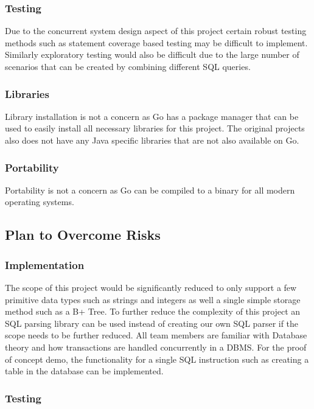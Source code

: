 \documentclass[12pt,letterpaper]{article}
\begin{document}
\subsubsection{Testing}

Due to the concurrent system design aspect of this project certain robust testing methods such as statement coverage based testing may be difficult to implement. Similarly exploratory testing would also be difficult due to the large number of scenarios that can be created by combining different SQL queries.

\subsubsection{Libraries}

Library installation is not a concern as Go has a package manager that can be used to easily install all necessary libraries for this project. The original projects also does not have any Java specific libraries that are not also available on Go.

\subsubsection{Portability}

Portability is not a concern as Go can be compiled to a binary for all modern operating systems.

\subsection{Plan to Overcome Risks}

\subsubsection{Implementation}

The scope of this project would be significantly reduced to only support a few primitive data types such as strings and integers as well a single simple storage method such as a B+ Tree. To further reduce the complexity of this project an SQL parsing library can be used instead of creating our own SQL parser if the scope needs to be further reduced. All team members are familiar with Database theory and how transactions are handled concurrently in a DBMS. For the proof of concept demo, the functionality for a single SQL instruction such as creating a table in the database can be implemented.

\subsubsection{Testing}
\end{document}
